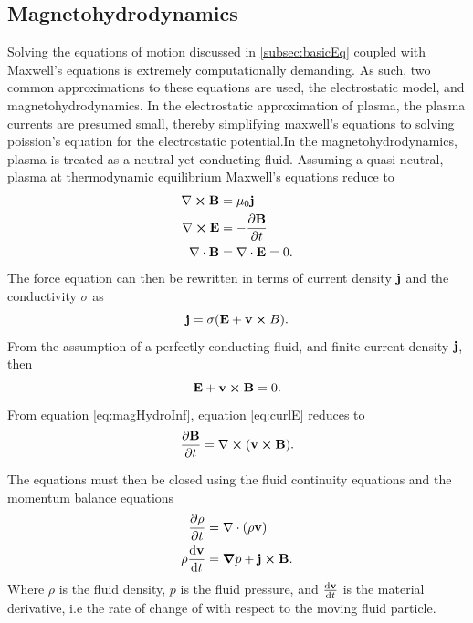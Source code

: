\subsection{Magnetohydrodynamics}
Solving the equations of motion discussed in \ref{subsec:basicEq} coupled with Maxwell's equations is extremely computationally demanding. As such, two common approximations to these equations are used, the electrostatic model, and magnetohydrodynamics. In the electrostatic approximation of plasma, the plasma currents are presumed small, thereby simplifying maxwell's equations to solving poission's equation for the electrostatic potential.In the magnetohydrodynamics, plasma is treated as a neutral yet conducting fluid. Assuming a quasi-neutral, plasma at thermodynamic equilibrium Maxwell's equations \parencite[Ch. 9-9-1]{Hockney1988} reduce to
\begin{subequations}
    \begin{align}
        \nabla \cross \vb{B} &= \mu_0 \vb{j} \\
        \nabla \cross \vb{E} &= - \pdv{\vb{B}}{t} \label{eq:curlE}\\
        \nabla \cdot \vb{B} &= \nabla \cdot \vb{E} = 0.    
    \end{align}
\end{subequations}
The force equation can then be rewritten in terms of current density $\vb{j}$ and the conductivity $\sigma$ as
\begin{equation}\label{eq:maghydroCurr}
    \vb{j} = \sigma (\vb{E} + \vb{v} \cross{B}).    
\end{equation}
From the assumption of a perfectly conducting fluid, and finite current density $\vb{j}$, then 
\begin{equation}\label{eq:magHydroInf}
    \vb{E} + \vb{v} \cross \vb{B} = 0.
\end{equation}
 From equation \eqref{eq:magHydroInf}, equation \eqref{eq:curlE} reduces to
\begin{equation}
    \pdv{\vb{B}}{t} = \nabla \cross (\vb{v} \cross \vb{B}).
\end{equation}

The equations must then be closed using the fluid continuity equations and the momentum balance equations
\begin{subequations}
    \begin{align}
        \pdv{\rho}{t} &= \nabla \cdot (\rho \vb{v}) \\
        \rho \dv{\vb{v}}{t} &= \grad{p} + \vb{j} \cross \vb{B}.
    \end{align}
\end{subequations}
Where $\rho$ is the fluid density, $p$ is the fluid pressure, and $\dv{\vb{v}}{t}$ is the material derivative, i.e the rate of change of with respect to the moving fluid particle.


